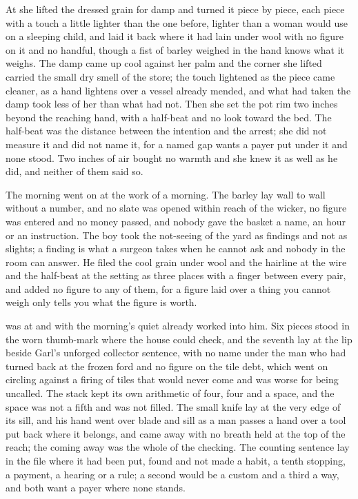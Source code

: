 At  she lifted the dressed grain for damp and turned it piece by piece, each piece with a touch a little lighter than the one before, lighter than a woman would use on a sleeping child, and laid it back where it had lain under wool with no figure on it and no handful, though a fist of barley weighed in the hand knows what it weighs. The damp came up cool against her palm and the corner she lifted carried the small dry smell of the store; the touch lightened as the piece came cleaner, as a hand lightens over a vessel already mended, and what had taken the damp took less of her than what had not. Then she set the pot rim two inches beyond the reaching hand, with a half-beat and no look toward the bed. The half-beat was the distance between the intention and the arrest; she did not measure it and did not name it, for a named gap wants a payer put under it and none stood. Two inches of air bought no warmth and she knew it as well as he did, and neither of them said so.

The morning went on at the work of a morning. The barley lay wall to wall without a number, and no slate was opened within reach of the wicker, no figure was entered and no money passed, and nobody gave the basket a name, an hour or an instruction. The boy took the not-seeing of the yard as findings and not as slights; a finding is what a surgeon takes when he cannot ask and nobody in the room can answer. He filed the cool grain under wool and the hairline at the wire and the half-beat at the setting as three places with a finger between every pair, and added no figure to any of them, for a figure laid over a thing you cannot weigh only tells you what the figure is worth.

\scenebreak

 was at  and  with the morning's quiet already worked into him. Six pieces stood in the worn thumb-mark where the house could check, and the seventh lay at the lip beside Garl's unforged collector sentence, with no name under the man who had turned back at the frozen ford and no figure on the tile debt, which went on circling against a firing of tiles that would never come and was worse for being uncalled. The stack kept its own arithmetic of four, four and a space, and the space was not a fifth and was not filled. The small knife lay at the very edge of its sill, and his hand went over blade and sill as a man passes a hand over a tool put back where it belongs, and came away with no breath held at the top of the reach; the coming away was the whole of the checking. The counting sentence lay in the file where it had been put, found and not made a habit, a tenth stopping, a payment, a hearing or a rule; a second would be a custom and a third a way, and both want a payer where none stands.

